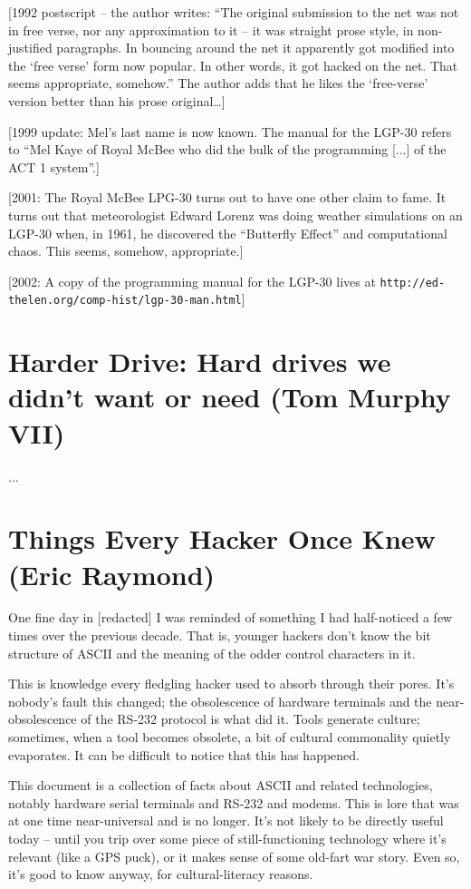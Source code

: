 \documentclass[10pt,twoside,openleft]{memoir}
\begin{document}
\vskip 0.4in

[1992 postscript -- the author writes: ``The original submission to the net was not in free verse, nor any approximation to it -- it was straight prose style, in non-justified paragraphs. In bouncing around the net it apparently got modified into the `free verse' form now popular. In other words, it got hacked on the net. That seems appropriate, somehow.'' The author adds that he likes the `free-verse' version better than his prose original\dots]

[1999 update: Mel's last name is now known. The manual for the LGP-30 refers to ``Mel Kaye of Royal McBee who did the bulk of the programming [...] of the ACT 1 system''.]

[2001: The Royal McBee LPG-30 turns out to have one other claim to fame. It turns out that meteorologist Edward Lorenz was doing weather simulations on an LGP-30 when, in 1961, he discovered the ``Butterfly Effect'' and computational chaos. This seems, somehow, appropriate.]

[2002: A copy of the programming manual for the LGP-30 lives at {\footnotesize \texttt{http://ed-thelen.org/comp-hist/lgp-30-man.html}}]


\chapter[Harder Drive (Tom Murphy VII]{Harder Drive: Hard drives we didn't want or need (Tom Murphy VII)}

...


\chapter{Things Every Hacker Once Knew (Eric Raymond)}

One fine day in [redacted] I was reminded of something I had half-noticed a few times over the previous decade. That is, younger hackers don't know the bit structure of ASCII and the meaning of the odder control characters in it.

This is knowledge every fledgling hacker used to absorb through their pores. It's nobody's fault this changed; the obsolescence of hardware terminals and the near-obsolescence of the RS-232 protocol is what did it. Tools generate culture; sometimes, when a tool becomes obsolete, a bit of cultural commonality quietly evaporates. It can be difficult to notice that this has happened.

This document is a collection of facts about ASCII and related technologies, notably hardware serial terminals and RS-232 and modems. This is lore that was at one time near-universal and is no longer. It's not likely to be directly useful today -- until you trip over some piece of still-functioning technology where it's relevant (like a GPS puck), or it makes sense of some old-fart war story. Even so, it's good to know anyway, for cultural-literacy reasons.
\end{document}
